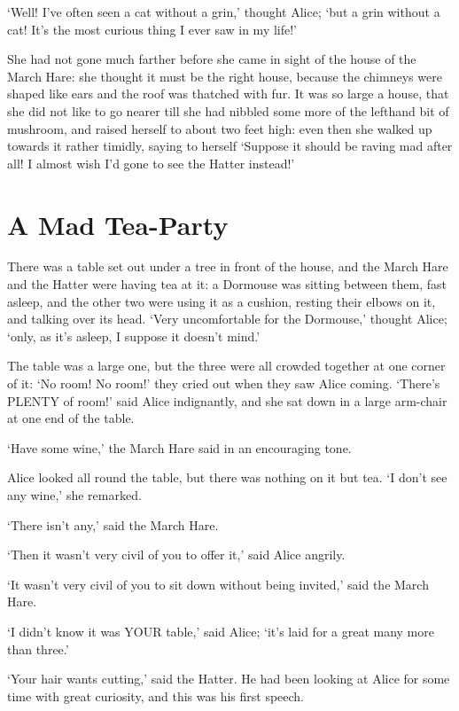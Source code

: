 \documentclass[12pt]{book}
\begin{document}
\begin{Parallel}[p]{}{}
{‘Well! I’ve often seen a cat without a grin,’ thought Alice; ‘but a grin without a cat! It’s the most curious thing I ever saw in my life!’

She had not gone much farther before she came in sight of the house of the March Hare: she thought it must be the right house, because the chimneys were shaped like ears and the roof was thatched with fur. It was so large a house, that she did not like to go nearer till she had nibbled some more of the lefthand bit of mushroom, and raised herself to about two feet high: even then she walked up towards it rather timidly, saying to herself ‘Suppose it should be raving mad after all! I almost wish I’d gone to see the Hatter instead!’




\section{A Mad Tea-Party}

There was a table set out under a tree in front of the house, and the March Hare and the Hatter were having tea at it: a Dormouse was sitting between them, fast asleep, and the other two were using it as a cushion, resting their elbows on it, and talking over its head. ‘Very uncomfortable for the Dormouse,’ thought Alice; ‘only, as it’s asleep, I suppose it doesn’t mind.’

The table was a large one, but the three were all crowded together at one corner of it: ‘No room! No room!’ they cried out when they saw Alice coming. ‘There’s PLENTY of room!’ said Alice indignantly, and she sat down in a large arm-chair at one end of the table.

‘Have some wine,’ the March Hare said in an encouraging tone.

Alice looked all round the table, but there was nothing on it but tea. ‘I don’t see any wine,’ she remarked.

‘There isn’t any,’ said the March Hare.

‘Then it wasn’t very civil of you to offer it,’ said Alice angrily.

‘It wasn’t very civil of you to sit down without being invited,’ said the March Hare.

‘I didn’t know it was YOUR table,’ said Alice; ‘it’s laid for a great many more than three.’

‘Your hair wants cutting,’ said the Hatter. He had been looking at Alice for some time with great curiosity, and this was his first speech.

}
\end{Parallel}
\end{document}
